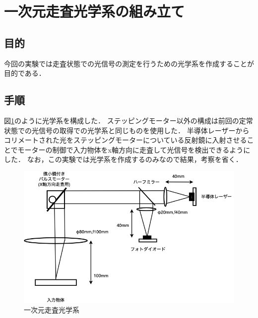 \documentclass[11pt, a4paper,twocolumn]{jarticle}
\begin{document}
\section{一次元走査光学系の組み立て}
\subsection{目的}
今回の実験では走査状態での光信号の測定を行うための光学系を作成することが目的である．

\subsection{手順}
図\ref{fig:7}のように光学系を構成した．
ステッピングモーター以外の構成は前回の定常状態での光信号の取得での光学系と同じものを使用した．
半導体レーザーからコリメートされた光をステッピングモーターについている反射鏡に入射させることでモーターの制御で入力物体をx軸方向に走査して光信号を検出できるようにした．
なお，この実験では光学系を作成するのみなので結果，考察を省く．


\begin{figure}[ht]
 \begin{center}
  \includegraphics[width=0.8\linewidth]{fig7.png}
 \end{center}
 \caption{一次元走査光学系}
 \label{fig:7}
\end{figure}


\newpage
\end{document}
